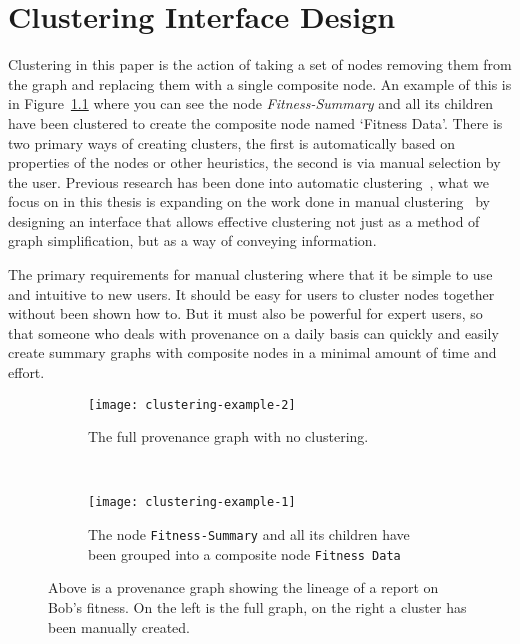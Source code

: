 \chapter{Clustering Interface Design}


Clustering in this paper is the action of taking a set of nodes removing them from the graph and replacing them with a single composite node. An example of this is in Figure~\ref{fig:clustering-example} where you can see the node \textit{Fitness-Summary} and all its children have been clustered to create the composite node named `Fitness Data'. There is two primary ways of creating clusters, the first is automatically based on properties of the nodes or other heuristics, the second is via manual selection by the user. Previous research has been done into automatic clustering~\cite{Borkin2013,Seltzer2011}, what we focus on in this thesis is expanding on the work done in manual clustering~\cite{Biton2007} by designing an interface that allows effective clustering not just as a method of graph simplification, but as a way of conveying information.

The primary requirements for manual clustering where that it be simple to use and intuitive to new users. It should be easy for users to cluster nodes together without been shown how to. But it must also be powerful for expert users, so that someone who deals with provenance on a daily basis can quickly and easily create summary graphs with composite nodes in a minimal amount of time and effort.

\begin{figure}[h]
  \centering
  \begin{subfigure}[t]{0.5\textwidth}
    \texttt{[image: clustering-example-2]}
    \caption{The full provenance graph with no clustering.}
  \end{subfigure}
  ~
  \begin{subfigure}[t]{0.5\textwidth}
    \texttt{[image: clustering-example-1]}
	\caption{The node \texttt{Fitness-Summary} and all its children have been grouped into a composite node \texttt{Fitness Data}}
  \end{subfigure}
  \caption{Above is a provenance graph showing the lineage of a report on Bob's fitness. On the left is the full graph, on the right a cluster has been manually created.}
  \label{fig:clustering-example}
\end{figure}


